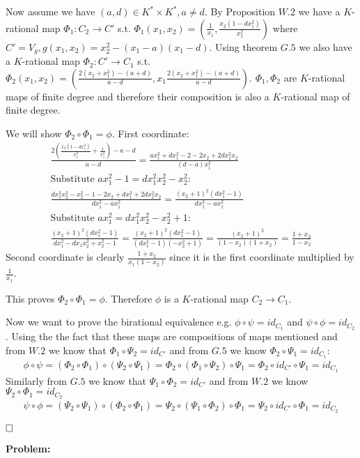 \documentclass[12pt, a4paper]{article}
\newcommand{\qed}{\hfill\square}
\begin{document}
Now assume we have $(a,d) \in K^* \times K^*, a\neq d$. By Proposition $W.2$ we have a $K$-rational map $\Phi_1: C_2 \rightarrow C'$ s.t. $\Phi_1(x_1,x_2) = \left(\frac{1}{x_1}, \frac{x_2(1-dx_1^2)}{x_1^2} \right)$ where $C' = V_g, g(x_1,x_2) = x_2^2-(x_1-a)(x_1-d)$. Using theorem $G.5$ we also have a $K$-rational map $\Phi_2: C' \rightarrow C_1$ s.t. $\Phi_2(x_1,x_2) = \left( \frac{2(x_2+x_1^2)-(a+d)}{a-d}, x_1\frac{2(x_2+x_1^2)-(a+d)}{a-d}\right)$. $\Phi_1, \Phi_2$ are $K$-rational maps of finite degree and therefore their composition is also a $K$-rational map of finite degree.

We will show $\Phi_2 \circ \Phi_1 = \phi$. First coordinate:
\begin{gather*}
\frac{2\left(\frac{x_2(1-dx_1^2)}{x_1^2}+\frac{1}{x_1^2}\right)-a-d}{a-d} = \frac{ax_1^2+dx_1^2-2-2x_2+2dx_1^2x_2}{(d-a)x_1^2}\\
\text{Substitute $ax_1^2-1 = dx_1^2x_2^2-x_2^2$:}\\
\frac{dx_1^2x_2^2-x_2^2-1-2x_2+dx_1^2+2dx_1^2x_2}{dx_1^2-ax_1^2} = \frac{(x_2+1)^2(dx_1^2-1)}{dx_1^2-ax_1^2}\\
\text{Substitute $ax_1^2 = dx_1^2x_2^2-x_2^2+1$:}\\
\frac{(x_2+1)^2(dx_1^2-1)}{dx_1^2-dx_1x_2^2+x_2^2-1} = \frac{(x_2+1)^2(dx_1^2-1)}{(dx_1^2-1)(-x_2^2+1)} = \frac{(x_2+1)^2}{(1-x_2)(1+x_2)} = \frac{1+x_2}{1-x_2}
\end{gather*}
Second coordinate is clearly $\frac{1+x_2}{x_1(1-x_2)}$ since it is the first coordinate multiplied by $\frac{1}{x_1}$.

This proves $\Phi_2 \circ \Phi_1 = \phi$. Therefore $\phi$ is a $K$-rational map $C_2 \rightarrow C_1$.

Now we want to prove the birational equivalence e.g. $\phi \circ \psi = id_{C_1}$ and $\psi \circ \phi = id_{C_2}$. Using the the fact that these maps are compositions of maps mentioned and from $W.2$ we know that $\Phi_1 \circ \Psi_2 = id_{C'}$ and from $G.5$ we know $\Phi_2 \circ \Psi_1 = id_{C_1}$:
\begin{gather*}
\phi \circ \psi = (\Phi_2 \circ \Phi_1) \circ (\Psi_2 \circ \Psi_1) = \Phi_2 \circ (\Phi_1 \circ \Psi_2) \circ \Psi_1 = \Phi_2 \circ id_{C'} \circ \Psi_1 = id_{C_1}
\end{gather*}
Similarly from $G.5$ we know that $\Psi_1 \circ \Phi_2 = id_{C'}$ and from $W.2$ we know $\Psi_2 \circ \Phi_1 = id_{C_2}$
\begin{gather*}
\psi \circ \phi =  (\Psi_2 \circ \Psi_1) \circ (\Phi_2 \circ \Phi_1) = \Psi_2 \circ (\Psi_1 \circ \Phi_2) \circ \Phi_1 = \Psi_2 \circ id_{C'} \circ \Phi_1 = id_{C_2}
\end{gather*}

$\qed$

\textbf{Problem:}
\end{document}
